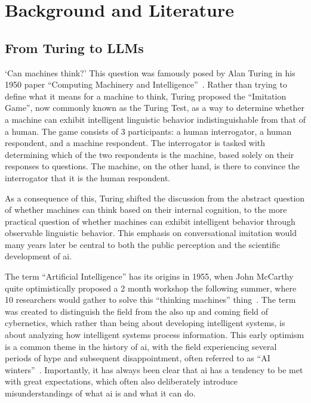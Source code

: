\chapter{Background and Literature}\label{literature}
\section{From Turing to LLMs}
`Can machines think?' This question was famously posed by Alan Turing in his 1950 paper ``Computing Machinery and Intelligence''~\cite{turing_computing_1950}. Rather than trying to define what it means for a machine to think, Turing proposed the ``Imitation Game'', now commonly known as the Turing Test, as a way to determine whether a machine can exhibit intelligent linguistic behavior indistinguishable from that of a human. The game consists of 3 participants: a human interrogator, a human respondent, and a machine respondent. The interrogator is tasked with determining which of the two respondents is the machine, based solely on their responses to questions. The machine, on the other hand, is there to convince the interrogator that it is the human respondent.

As a consequence of this, Turing shifted the discussion from the abstract question of whether machines can think based on their internal cognition, to the more practical question of whether machines can exhibit intelligent behavior through observable linguistic behavior. This emphasis on conversational imitation would many years later be central to both the public perception and the scientific development of \gls{ai}.

The term ``Artificial Intelligence'' has its origins in 1955, when John McCarthy quite optimistically proposed a 2 month workshop the following summer, where 10 researchers would gather to solve this ``thinking machines'' thing~\cite{strumke_maskiner_2023}. The term was created to distinguish the field from the also up and coming field of cybernetics, which rather than being about developing intelligent systems, is about analyzing how intelligent systems process information. This early optimism is a common theme in the history of \gls{ai}, with the field experiencing several periods of hype and subsequent disappointment, often referred to as ``AI winters''~\cite{strumke_maskiner_2023}. Importantly, it has always been clear that \gls{ai} has a tendency to be met with great expectations, which often also deliberately introduce misunderstandings of what \gls{ai} is and what it can do.

